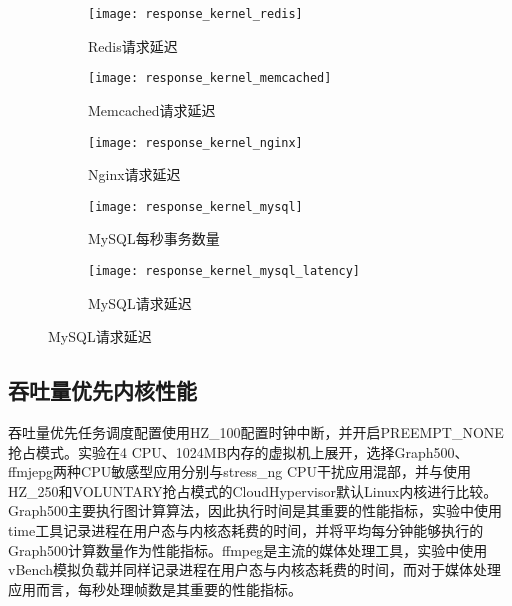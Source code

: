 \begin{figure}[H]
    \centering
    \begin{subfigure}[b]{0.32\textwidth}
      \texttt{[image: response\_kernel\_redis]}
      \caption{Redis请求延迟}
      \label{fig:response_kernel_redis}
    \end{subfigure}
    \begin{subfigure}[b]{0.32\textwidth}
      \texttt{[image: response\_kernel\_memcached]}
      \caption{Memcached请求延迟}
      \label{fig:response_kernel_memcached}
    \end{subfigure}
    \begin{subfigure}[b]{0.32\textwidth}
        \texttt{[image: response\_kernel\_nginx]}
        \caption{Nginx请求延迟}
        \label{fig:memcached_response}
      \end{subfigure}
      \begin{subfigure}[b]{0.32\textwidth}
        \texttt{[image: response\_kernel\_mysql]}
        \caption{\quad MySQL每秒事务数量}
        \label{fig:memcached_response}
      \end{subfigure}
      \begin{subfigure}[b]{0.32\textwidth}
        \texttt{[image: response\_kernel\_mysql\_latency]}
        \caption{MySQL请求延迟}
        \label{fig:memcached_response}
      \end{subfigure}
    \label{fig:perf_response}
\end{figure}

\subsection{吞吐量优先内核性能}


吞吐量优先任务调度配置使用HZ\_100配置时钟中断，并开启PREEMPT\_NONE抢占模式。实验在4 CPU、1024MB内存的虚拟机上展开，选择Graph500、ffmjepg两种CPU敏感型应用分别与stress\_ng CPU干扰应用混部，并与使用HZ\_250和VOLUNTARY抢占模式的CloudHypervisor默认Linux内核进行比较。Graph500主要执行图计算算法，因此执行时间是其重要的性能指标，实验中使用time工具记录进程在用户态与内核态耗费的时间，并将平均每分钟能够执行的Graph500计算数量作为性能指标。ffmpeg是主流的媒体处理工具，实验中使用vBench模拟负载并同样记录进程在用户态与内核态耗费的时间，而对于媒体处理应用而言，每秒处理帧数是其重要的性能指标。

